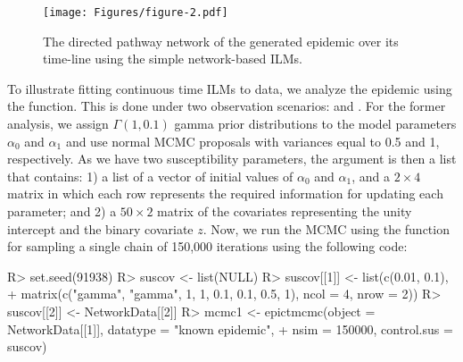 \documentclass[nojss,shortnames]{jss}
\begin{document}
\begin{figure}[!h]
\begin{center}
\texttt{[image: Figures/figure-2.pdf]}
\caption{The directed pathway network of the generated epidemic over its time-line using the simple network-based ILMs.}
\label{fig.network-trans}
\end{center}
\end{figure}

To illustrate fitting continuous time ILMs to data, we analyze the epidemic using the  function. This is done under two observation scenarios:  and . For the former analysis, we assign $\Gamma(1,0.1)$ gamma prior distributions to the model parameters $\alpha_{0}$ and $\alpha_{1}$ and use normal MCMC proposals with variances equal to 0.5 and 1, respectively. 
As we have two susceptibility parameters, 
the argument  is then a list that contains: 1) a list of a vector of initial values of $\alpha_{0}$ and $\alpha_{1}$, and a $2 \times 4$ matrix in which each row represents the required information for updating each parameter; and 2) a $50 \times 2$ matrix of the covariates representing the unity intercept and the binary covariate $z$.
Now, we run the MCMC using the  function for sampling a single chain of 150,000 iterations using the following code: 

\begin{Sinput}
R> set.seed(91938)
R> suscov <- list(NULL)
R> suscov[[1]] <- list(c(0.01, 0.1), 
+    matrix(c("gamma", "gamma", 1, 1, 0.1, 0.1, 0.5, 1), ncol = 4, nrow = 2))
R> suscov[[2]] <- NetworkData[[2]]
R> mcmc1 <- epictmcmc(object = NetworkData[[1]], datatype = "known epidemic",
+    nsim = 150000, control.sus = suscov)
\end{Sinput}
\end{document}

